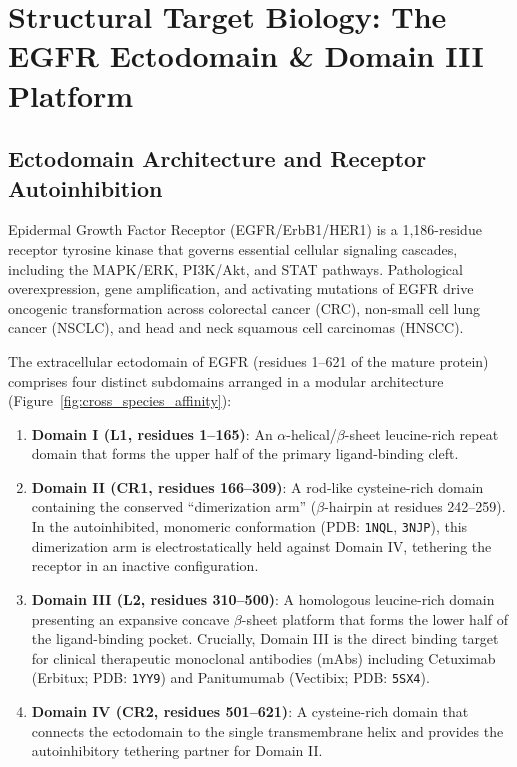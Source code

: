 \documentclass[11pt]{article}
\begin{document}
\section{Structural Target Biology: The EGFR Ectodomain \& Domain III Platform}

\subsection{Ectodomain Architecture and Receptor Autoinhibition}
Epidermal Growth Factor Receptor (EGFR/ErbB1/HER1) is a 1,186-residue receptor tyrosine kinase that governs essential cellular signaling cascades, including the MAPK/ERK, PI3K/Akt, and STAT pathways. Pathological overexpression, gene amplification, and activating mutations of EGFR drive oncogenic transformation across colorectal cancer (CRC), non-small cell lung cancer (NSCLC), and head and neck squamous cell carcinomas (HNSCC).

The extracellular ectodomain of EGFR (residues 1--621 of the mature protein) comprises four distinct subdomains arranged in a modular architecture (Figure~\ref{fig:cross_species_affinity}):
\begin{enumerate}
    \item \textbf{Domain I (L1, residues 1--165)}: An $\alpha$-helical/$\beta$-sheet leucine-rich repeat domain that forms the upper half of the primary ligand-binding cleft.
    \item \textbf{Domain II (CR1, residues 166--309)}: A rod-like cysteine-rich domain containing the conserved ``dimerization arm'' ($\beta$-hairpin at residues 242--259). In the autoinhibited, monomeric conformation (PDB: \texttt{1NQL}, \texttt{3NJP}), this dimerization arm is electrostatically held against Domain IV, tethering the receptor in an inactive configuration.
    \item \textbf{Domain III (L2, residues 310--500)}: A homologous leucine-rich domain presenting an expansive concave $\beta$-sheet platform that forms the lower half of the ligand-binding pocket. Crucially, Domain III is the direct binding target for clinical therapeutic monoclonal antibodies (mAbs) including Cetuximab (Erbitux; PDB: \texttt{1YY9}) and Panitumumab (Vectibix; PDB: \texttt{5SX4}).
    \item \textbf{Domain IV (CR2, residues 501--621)}: A cysteine-rich domain that connects the ectodomain to the single transmembrane helix and provides the autoinhibitory tethering partner for Domain II.
\end{enumerate}
\end{document}
